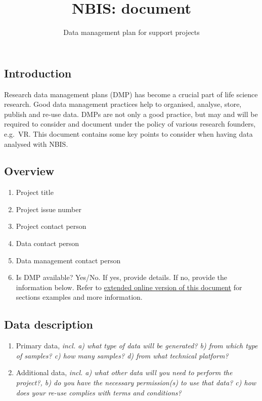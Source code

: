 \documentclass[10pt,a4paper,]{article}
\title{NBIS: document}
\subtitle{Data management plan for support projects}
\author{}
\date{}
\providecommand{\tightlist}{%
  \setlength{\itemsep}{0pt}\setlength{\parskip}{0pt}}
\begin{document}
\maketitle

\subsection{Introduction}\label{introduction}

Research data management plans (DMP) has become a crucial part of life
science research. Good data management practices help to organised,
analyse, store, publish and re-use data. DMPs are not only a good
practice, but may and will be required to consider and document under
the policy of various research founders, e.g.~VR. This document contains
some key points to consider when having data analysed with NBIS.

\subsection{Overview}\label{overview}

\begin{enumerate}
\def\labelenumi{\arabic{enumi}.}
\tightlist
\item
  Project title
\item
  Project issue number
\item
  Project contact person
\item
  Data contact person
\item
  Data management contact person
\item
  Is DMP available? Yes/No. If yes, provide details. If no, provide the
  information below. Refer to
  \href{https://docs.google.com/document/d/1g6vJNIrkSnylASkNHB9Zwm5N6jvTgoSxBjS_bexRPsY/edit\#heading=h.y6r21qqu4ir4}{extended
  online version of this document} for sections examples and more
  information.
\end{enumerate}

\subsection{Data description}\label{data-description}

\begin{enumerate}
\def\labelenumi{\arabic{enumi}.}
\tightlist
\item
  Primary data, \emph{incl. a) what type of data will be generated? b)
  from which type of samples? c) how many samples? d) from what
  technical platform?}
\item
  Additional data, \emph{incl. a) what other data will you need to
  perform the project?, b) do you have the necessary permission(s) to
  use that data? c) how does your re-use complies with terms and
  conditions?}
\end{enumerate}
\end{document}
